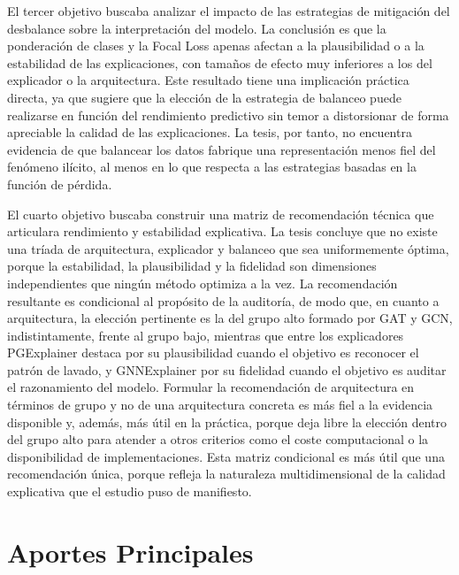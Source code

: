 El tercer objetivo buscaba analizar el impacto de las estrategias de mitigación del desbalance sobre la interpretación del modelo. La conclusión es que la ponderación de clases y la Focal Loss apenas afectan a la plausibilidad o a la estabilidad de las explicaciones, con tamaños de efecto muy inferiores a los del explicador o la arquitectura. Este resultado tiene una implicación práctica directa, ya que sugiere que la elección de la estrategia de balanceo puede realizarse en función del rendimiento predictivo sin temor a distorsionar de forma apreciable la calidad de las explicaciones. La tesis, por tanto, no encuentra evidencia de que balancear los datos fabrique una representación menos fiel del fenómeno ilícito, al menos en lo que respecta a las estrategias basadas en la función de pérdida.

El cuarto objetivo buscaba construir una matriz de recomendación técnica que articulara rendimiento y estabilidad explicativa. La tesis concluye que no existe una tríada de arquitectura, explicador y balanceo que sea uniformemente óptima, porque la estabilidad, la plausibilidad y la fidelidad son dimensiones independientes que ningún método optimiza a la vez. La recomendación resultante es condicional al propósito de la auditoría, de modo que, en cuanto a arquitectura, la elección pertinente es la del grupo alto formado por GAT y GCN, indistintamente, frente al grupo bajo, mientras que entre los explicadores PGExplainer destaca por su plausibilidad cuando el objetivo es reconocer el patrón de lavado, y GNNExplainer por su fidelidad cuando el objetivo es auditar el razonamiento del modelo. Formular la recomendación de arquitectura en términos de grupo y no de una arquitectura concreta es más fiel a la evidencia disponible y, además, más útil en la práctica, porque deja libre la elección dentro del grupo alto para atender a otros criterios como el coste computacional o la disponibilidad de implementaciones. Esta matriz condicional es más útil que una recomendación única, porque refleja la naturaleza multidimensional de la calidad explicativa que el estudio puso de manifiesto.

\section{Aportes Principales}

